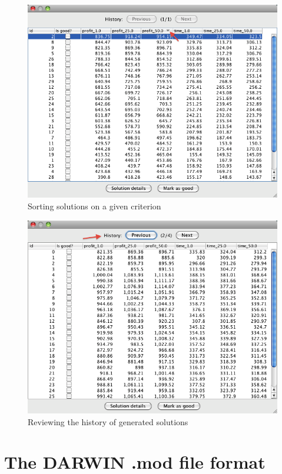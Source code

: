 \begin{figure}
  \centering
  \includegraphics[scale=0.7]{img/manual/09_sorton}
  \caption{Sorting solutions on a given criterion}
  \label{manual_09_sorton}
\end{figure}

\begin{figure}
  \centering
  \includegraphics[scale=0.7]{img/manual/10_history}
  \caption{Reviewing the history of generated solutions}
  \label{manual_10_history}
\end{figure}

\clearpage{}
\section*{The DARWIN .mod file format}

